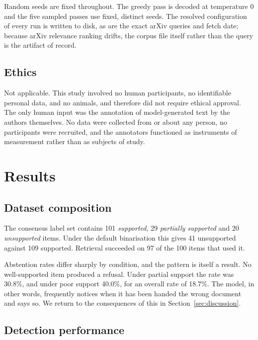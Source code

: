 \documentclass[11pt,a4paper]{article}
\begin{document}
Random seeds are fixed throughout. The greedy pass is decoded at temperature $0$
and the five sampled passes use fixed, distinct seeds. The resolved
configuration of every run is written to disk, as are the exact arXiv queries and
fetch date; because arXiv relevance ranking drifts, the corpus file itself rather
than the query is the artifact of record.

\subsection{Ethics}

Not applicable. This study involved no human participants, no identifiable
personal data, and no animals, and therefore did not require ethical approval.
The only human input was the annotation of model-generated text by the authors
themselves. No data were collected from or about any person, no participants
were recruited, and the annotators functioned as instruments of measurement
rather than as subjects of study.

\section{Results}
\label{sec:results}

\subsection{Dataset composition}

The consensus label set contains 101 \emph{supported}, 29 \emph{partially
supported} and 20 \emph{unsupported} items. Under the default binarisation this
gives 41 unsupported against 109 supported. Retrieval succeeded on 97 of the 100
items that used it.

Abstention rates differ sharply by condition, and the pattern is itself a
result. No well-supported item produced a refusal. Under partial support the
rate was 30.8\%, and under poor support 40.0\%, for an overall rate of 18.7\%.
The model, in other words, frequently notices when it has been handed the wrong
document and says so. We return to the consequences of this in
Section~\ref{sec:discussion}.

\subsection{Detection performance}
\end{document}

